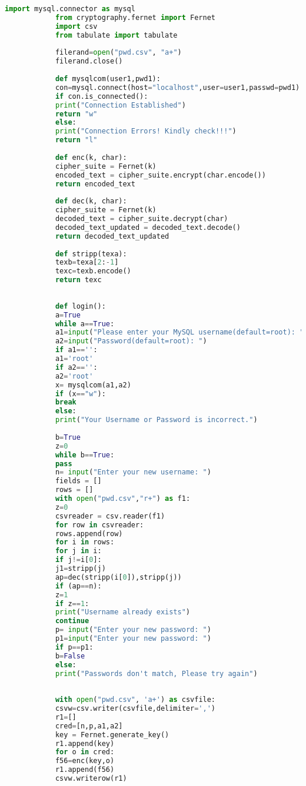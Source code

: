 \documentclass[12pt,a4paper]{article}
\begin{document}
	\newpage
	\begin{normalsize}
		{}
		\vspace{1cm}
		\begin{lstlisting}[language=Python]		
			import mysql.connector as mysql
			from cryptography.fernet import Fernet
			import csv
			from tabulate import tabulate
			
			filerand=open("pwd.csv", "a+")
			filerand.close()
			
			def mysqlcom(user1,pwd1):
			con=mysql.connect(host="localhost",user=user1,passwd=pwd1)
			if con.is_connected():
			print("Connection Established")
			return "w"
			else:
			print("Connection Errors! Kindly check!!!")
			return "l"
			
			def enc(k, char):
			cipher_suite = Fernet(k)
			encoded_text = cipher_suite.encrypt(char.encode())
			return encoded_text
			
			def dec(k, char):
			cipher_suite = Fernet(k)
			decoded_text = cipher_suite.decrypt(char)
			decoded_text_updated = decoded_text.decode()
			return decoded_text_updated
			
			def stripp(texa):
			texb=texa[2:-1]
			texc=texb.encode()
			return texc
			
			
			def login():
			a=True
			while a==True:
			a1=input("Please enter your MySQL username(default=root): ")
			a2=input("Password(default=root): ")
			if a1=='':
			a1='root'
			if a2=='':
			a2='root'
			x= mysqlcom(a1,a2)
			if (x=="w"):
			break
			else:
			print("Your Username or Password is incorrect.")
			
			b=True
			z=0
			while b==True:
			pass
			n= input("Enter your new username: ")
			fields = []
			rows = []
			with open("pwd.csv","r+") as f1:
			z=0
			csvreader = csv.reader(f1)
			for row in csvreader:
			rows.append(row)
			for i in rows:
			for j in i:
			if j!=i[0]:
			j1=stripp(j)
			ap=dec(stripp(i[0]),stripp(j))
			if (ap==n):
			z=1
			if z==1:
			print("Username already exists")
			continue
			p= input("Enter your new password: ")
			p1=input("Enter your new password: ")
			if p==p1:
			b=False
			else:
			print("Passwords don't match, Please try again")
			
			
			with open("pwd.csv", 'a+') as csvfile:
			csvw=csv.writer(csvfile,delimiter=',')
			r1=[]
			cred=[n,p,a1,a2]
			key = Fernet.generate_key()
			r1.append(key)
			for o in cred:
			f56=enc(key,o)
			r1.append(f56)
			csvw.writerow(r1)
			

\end{lstlisting}
\end{normalsize}
\end{document}
